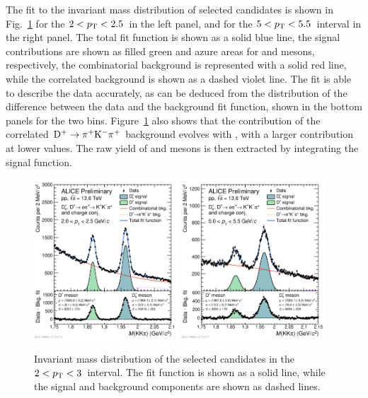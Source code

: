 The fit to the invariant mass distribution of selected candidates is shown in Fig.~\ref{fig:new_fit} for the $2<p_\mathrm{T}<2.5$~\gevc in the left panel, and for the $5<p_\mathrm{T}<5.5$~\gevc interval in the right panel. The total fit function is shown as a solid blue line, the signal contributions are shown as filled green and azure areas for \dpl and \ds mesons, respectively, the combinatorial background is represented with a solid red line, while the correlated background is shown as a dashed violet line. The fit is able to describe the data accurately, as can be deduced from the distribution of the difference between the data and the background fit function, shown in the bottom panels for the two \pt bins. Figure~\ref{fig:new_fit} also shows that the contribution of the correlated $\mathrm{D^+}\rightarrow\mathrm{\pi^+K^-\pi^+}$ background evolves with \pt, with a larger contribution at lower \pt values. The raw yield of \ds and \dpl mesons is then extracted by integrating the signal function.

\begin{figure}[htb]
    \centering
    \includegraphics[width=0.48\textwidth]{Figures/Chapter 5/invmassfit_2_2p5.pdf}
    \includegraphics[width=0.48\textwidth]{Figures/Chapter 5/invmassfit_5_5p5.pdf}
    \caption{Invariant mass distribution of the selected candidates in the $2<p_\mathrm{T}<3$~\gevc interval. The fit function is shown as a solid line, while the signal and background components are shown as dashed lines.}
    \label{fig:new_fit}
\end{figure}

